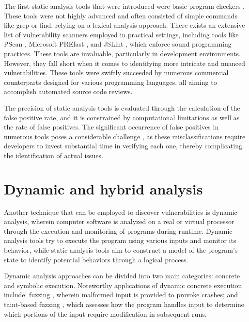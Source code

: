 The first static analysis tools that were introduced were basic program checkers \cite{JViega_2000}. These tools were not highly advanced and often consisted of simple commands like grep or find, relying on a lexical analysis approach. There exists an extensive list of vulnerability scanners employed in practical settings, including tools like PScan \cite{PScan}, Microsoft PREfast \cite{Larus_2004}, and JSLint \cite{JSLint}, which enforce sound programming practices. These tools are invaluable, particularly in development environments. However, they fall short when it comes to identifying more intricate and nuanced vulnerabilities. These tools were swiftly succeeded by numerous commercial counterparts designed for various programming languages, all aiming to accomplish automated source code reviews.

The precision of static analysis tools is evaluated through the calculation of the false positive rate, and it is constrained by computational limitations as well as the rate of false positives. The significant occurrence of false positives in numerous tools poses a considerable challenge \cite{Kui_Liu2018}, as these misclassifications require developers to invest substantial time in verifying each one, thereby complicating the identification of actual issues.




\section{Dynamic and hybrid analysis} %
\label{sec:	Dynamic_hybrid_analysis}

Another technique that can be employed to discover vulnerabilities is dynamic analysis, wherein computer software is analyzed on a real or virtual processor \cite{5066568} through the execution and monitoring of programs during runtime. Dynamic analysis tools try to execute the program using various inputs and monitor its behavior, while static analysis tools aim to construct a model of the program's state to identify potential behaviors through a logical process.

Dynamic analysis approaches can be divided into two main categories: concrete and symbolic execution. Noteworthy applications of dynamic concrete execution include: fuzzing \cite{Godefroid_2012, Vijay_Ganesh2009}, wherein malformed input is provided to provoke crashes; and taint-based fuzzing \cite{Newsome2005, Sofia_Bekrar2012}, which assesses how the program handles input to determine which portions of the input require modification in subsequent runs.


